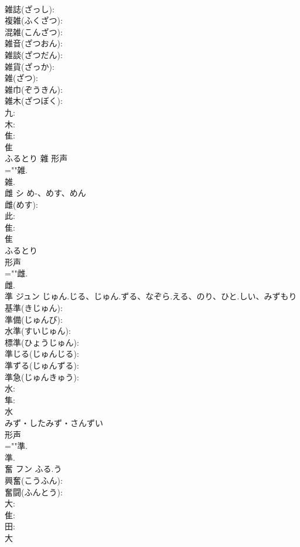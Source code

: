 \documentclass[8pt]{extreport}
\begin{document}
\begin{CJK}{UTF8}{min}
\\	雑誌(ざっし): 
\\	複雑(ふくざつ): 
\\	混雑(こんざつ): 
\\	雑音(ざつおん): 
\\	雑談(ざつだん): 
\\	雑貨(ざっか): 
\\	雑(ざつ): 
\\	雑巾(ぞうきん): 
\\	雑木(ざつぼく): 
\\	九: 
\\	木: 
\\	隹: 
\\	隹	
\\	ふるとり	雜	形声 
\\	=""雑.
\\	雑.
\\	雌	シ	め-、めす、めん		
\\	雌(めす): 
\\	此: 
\\	隹: 
\\	隹	
\\	ふるとり	
\\	形声 
\\	=""雌.
\\	雌.
\\	準	ジュン	じゅん.じる、じゅん.ずる、なぞら.える、のり、ひと.しい、みずもり		
\\	基準(きじゅん): 
\\	準備(じゅんび): 
\\	水準(すいじゅん): 
\\	標準(ひょうじゅん): 
\\	準じる(じゅんじる): 
\\	準ずる(じゅんずる): 
\\	準急(じゅんきゅう): 
\\	水: 
\\	隼: 
\\	水	
\\	みず・したみず・さんずい	
\\	形声 
\\	=""準.
\\	準.
\\	奮	フン	ふる.う		
\\	興奮(こうふん): 
\\	奮闘(ふんとう): 
\\	大: 
\\	隹: 
\\	田: 
\\	大	

\end{CJK}
\end{document}
